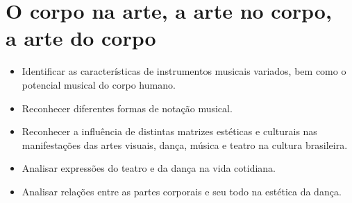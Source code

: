\chapter[O corpo na arte, a arte no corpo, a arte do corpo]{\Large O corpo na arte, a arte no corpo,\\ a arte do corpo}

\vspace*{-1\baselineskip}



\begin{itemize}
\item Identificar as características de instrumentos musicais variados, bem
como o potencial musical do corpo humano.

\item Reconhecer diferentes formas de notação musical.

\item Reconhecer a influência de distintas matrizes estéticas e culturais
nas manifestações das artes visuais, dança, música e teatro na cultura
brasileira.

\item Analisar expressões do teatro e da dança na vida cotidiana.

\item Analisar relações entre as partes corporais e seu todo na estética da dança.
\end{itemize}

